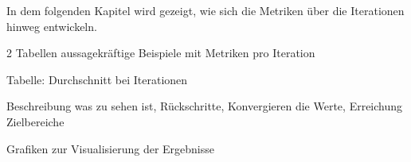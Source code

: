 
In dem folgenden Kapitel wird gezeigt, wie sich die Metriken über die Iterationen hinweg entwickeln.

2 Tabellen aussagekräftige Beispiele mit Metriken pro Iteration

Tabelle: Durchschnitt bei Iterationen

Beschreibung was zu sehen ist, Rückschritte, Konvergieren die Werte, Erreichung Zielbereiche

Grafiken zur Visualisierung der Ergebnisse